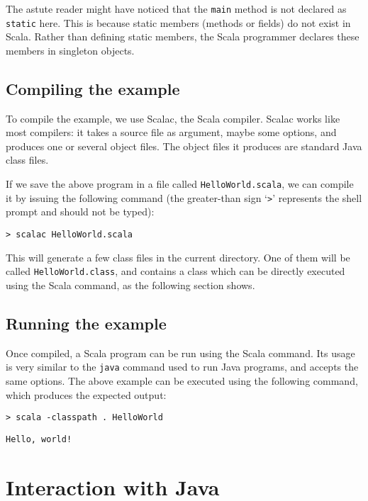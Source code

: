 \documentclass[a4paper,11pt,twoside,titlepage]{article}
\begin{document}
The astute reader might have noticed that the \lstinline?main? method is
not declared as \lstinline?static? here. This is because static members
(methods or fields) do not exist in Scala. Rather than defining static
members, the Scala programmer declares these members in singleton
objects.

\subsection*{Compiling the example}
\label{sec:compiling-example}

To compile the example, we use Scalac, the Scala compiler. Scalac
works like most compilers: it takes a source file as argument, maybe
some options, and produces one or several object files. The object
files it produces are standard Java class files.

If we save the above program in a file called
\verb|HelloWorld.scala|, we can compile it by issuing the following
command (the greater-than sign `\verb|>|' represents the shell prompt
and should not be typed):
\begin{verbatim}
> scalac HelloWorld.scala
\end{verbatim}
This will generate a few class files in the current directory. One of
them will be called \lstinline?HelloWorld.class?, and contains a class
which can be directly executed using the Scala command, as the
following section shows.

\subsection*{Running the example}
\label{sec:running-example}

Once compiled, a Scala program can be run using the Scala command.
Its usage is very similar to the \lstinline?java? command used to run Java
programs, and accepts the same options. The above example can be
executed using the following command, which produces the expected
output:
\begin{verbatim}
> scala -classpath . HelloWorld
\end{verbatim}
\begin{verbatim}
Hello, world!
\end{verbatim}

\section*{Interaction with Java}
\label{sec:inter-with-java}
\end{document}
